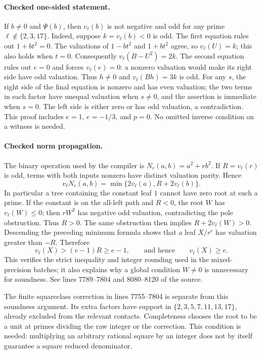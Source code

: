 \documentclass[11pt]{article}
\theoremstyle{definition}
\begin{document}
\paragraph{Checked one-sided statement.}
If $b\ne0$ and $\Psi(b)$, then $v_\ell(b)$ is not negative and odd
for any prime $\ell\notin\{2,3,17\}$.  Indeed, suppose
$k=v_\ell(b)<0$ is odd.  The first equation rules out $1+bt^2=0$.
The valuations of $1-bt^2$ and $1+bt^2$ agree, so $v_\ell(U)=k$;
this also holds when $t=0$.  Consequently
$v_\ell(B-U^2)=2k$.  The second equation rules out $e=0$ and forces
$v_\ell(e)=0$: a nonzero valuation would make its right side have
odd valuation.  Thus $h\ne0$ and $v_\ell(Bh)=3k$ is odd.
For any $s$, the right side of the final equation is nonzero and has
even valuation; the two terms in each factor have unequal valuation
when $s\ne0$, and the assertion is immediate when $s=0$.
The left side is either zero or has odd valuation, a contradiction.
This proof includes $e=1$, $e=-1/3$, and $p=0$.  No omitted inverse
condition on a witness is needed.

\paragraph{Checked norm propagation.}
The binary operation used by the compiler is
$N_r(a,b)=a^2+rb^2$.  If $R=v_\ell(r)$ is odd, terms with both inputs
nonzero have distinct valuation parity.  Hence
\[
 v_\ell N_r(a,b)=\min\{2v_\ell(a),R+2v_\ell(b)\}.
\]
In particular a tree containing the constant leaf $1$ cannot have zero
root at such a prime.  If the constant is on the all-left path and
$R<0$, the root $W$ has $v_\ell(W)\le0$; then $rW^2$ has negative
odd valuation, contradicting the pole obstruction.  Thus $R>0$.
The same obstruction then implies
$R+2v_\ell(W)>0$.  Descending the preceding minimum formula shows
that a leaf $X/r^e$ has valuation greater than $-R$.  Therefore
\[
 v_\ell(X)>(e-1)R\ge e-1,
 \qquad\text{and hence}\qquad v_\ell(X)\ge e.
\]
This verifies the strict inequality and integer rounding used in the
mixed-precision batches; it also explains why a global condition
$W\ne0$ is unnecessary for soundness.  See lines 7789--7804 and
8080--8120 of the source.

The finite squareclass correction in lines 7755--7804 is separate from
this soundness argument.  Its extra factors have support in
$\{2,3,5,7,11,13,17\}$, already excluded from the relevant contacts.
Completeness chooses the root to be a unit at primes dividing the raw
integer or the correction.  This condition is needed: multiplying an
arbitrary rational square by an integer does not by itself guarantee a
square reduced denominator.
\end{document}
